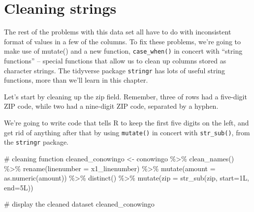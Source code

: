 \documentclass[
  letterpaper,
  DIV=11,
  numbers=noendperiod]{scrreprt}
\newenvironment{Shaded}{\begin{snugshade}}{\end{snugshade}}
\newcommand{\AttributeTok}[1]{\textcolor[rgb]{0.40,0.45,0.13}{#1}}
\newcommand{\CommentTok}[1]{\textcolor[rgb]{0.37,0.37,0.37}{#1}}
\newcommand{\FunctionTok}[1]{\textcolor[rgb]{0.28,0.35,0.67}{#1}}
\newcommand{\NormalTok}[1]{\textcolor[rgb]{0.00,0.23,0.31}{#1}}
\newcommand{\OtherTok}[1]{\textcolor[rgb]{0.00,0.23,0.31}{#1}}
\newcommand{\SpecialCharTok}[1]{\textcolor[rgb]{0.37,0.37,0.37}{#1}}
\begin{document}
\hypertarget{cleaning-strings}{%
\section{Cleaning strings}\label{cleaning-strings}}

The rest of the problems with this data set all have to do with
inconsistent format of values in a few of the columns. To fix these
problems, we're going to make use of mutate() and a new function,
\texttt{case\_when()} in concert with ``string functions'' -- special
functions that allow us to clean up columns stored as character strings.
The tidyverse package \texttt{stringr} has lots of useful string
functions, more than we'll learn in this chapter.

Let's start by cleaning up the zip field. Remember, three of rows had a
five-digit ZIP code, while two had a nine-digit ZIP code, separated by a
hyphen.

We're going to write code that tells R to keep the first five digits on
the left, and get rid of anything after that by using \texttt{mutate()}
in concert with \texttt{str\_sub()}, from the \texttt{stringr} package.

\begin{Shaded}
\begin{Highlighting}[]
\CommentTok{\# cleaning function}
\NormalTok{cleaned\_conowingo }\OtherTok{\textless{}{-}}\NormalTok{ conowingo }\SpecialCharTok{\%\textgreater{}\%}
  \FunctionTok{clean\_names}\NormalTok{() }\SpecialCharTok{\%\textgreater{}\%}
  \FunctionTok{rename}\NormalTok{(}\AttributeTok{linenumber =}\NormalTok{ x1\_linenumber) }\SpecialCharTok{\%\textgreater{}\%}
  \FunctionTok{mutate}\NormalTok{(}\AttributeTok{amount =} \FunctionTok{as.numeric}\NormalTok{(amount)) }\SpecialCharTok{\%\textgreater{}\%}
  \FunctionTok{distinct}\NormalTok{() }\SpecialCharTok{\%\textgreater{}\%}
  \FunctionTok{mutate}\NormalTok{(}\AttributeTok{zip =} \FunctionTok{str\_sub}\NormalTok{(zip, }\AttributeTok{start=}\NormalTok{1L, }\AttributeTok{end=}\NormalTok{5L))}


\CommentTok{\# display the cleaned dataset}
\NormalTok{cleaned\_conowingo}
\end{Highlighting}
\end{Shaded}
\end{document}
